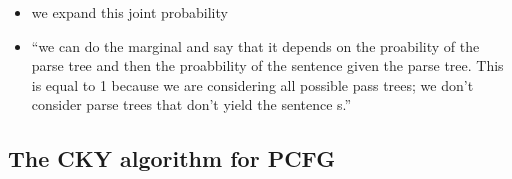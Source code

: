 \documentclass[11pt]{article}
\begin{document}
\begin{minipage}[l]{.5\linewidth}
    \begin{figure}[H]
        \centering
    \end{figure}    
\end{minipage}\hfill
\begin{minipage}[r]{.48\linewidth}
    \begin{itemize}
        \item we expand this joint probability
        \item ``we can do the marginal and say that it depends on the proability of the parse tree and then the proabbility of the sentence given the parse tree. This is equal to 1 because we are considering all possible pass trees; we don't consider parse trees that don't yield the sentence s.''
    \end{itemize}
\end{minipage}

\subsection{The CKY algorithm for PCFG}
\end{document}
